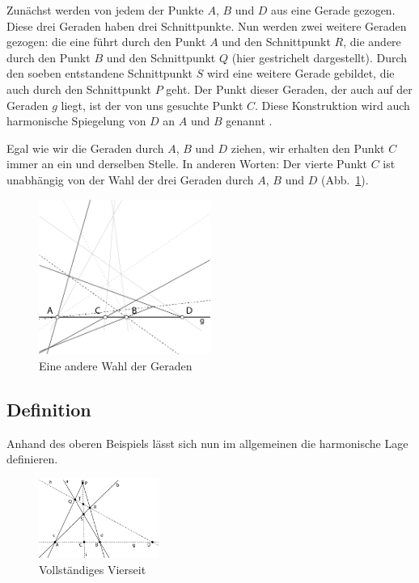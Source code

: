 \documentclass[12pt,a4paper]{article}
\begin{document}
Zunächst werden von jedem der Punkte $A$, $B$ und $D$ aus eine Gerade gezogen. Diese drei Geraden haben drei Schnittpunkte. Nun werden zwei weitere Geraden gezogen: die eine führt durch den Punkt $A$ und den Schnittpunkt $R$, die andere durch den Punkt $B$ und den Schnittpunkt $Q$ (hier gestrichelt dargestellt).
\newline
\newline
Durch den soeben entstandene Schnittpunkt $S$ wird eine weitere Gerade gebildet, die auch durch den Schnittpunkt $P$ geht. Der Punkt dieser Geraden, der auch auf der Geraden $g$ liegt, ist der von uns gesuchte Punkt $C$. Diese Konstruktion wird auch harmonische Spiegelung von $D$ an $A$ und $B$ genannt \citep[vgl.~][S.~34]{harmonischeLage}.

Egal wie wir die Geraden durch $A$, $B$ und $D$ ziehen, wir erhalten den Punkt $C$ immer an ein und derselben Stelle. In anderen Worten: Der vierte Punkt $C$ ist unabhängig von der Wahl der drei Geraden durch $A$, $B$ und $D$ (Abb.~\ref{fig:AndereWahl}).

\begin{figure}[htbp]
\centering
\includegraphics[width=0.5\textwidth]{Bilder/fuer_mehrere_geraden.png}
\caption{Eine andere Wahl der Geraden}
\label{fig:AndereWahl}
\end{figure}

\newpage
\subsection{Definition}
Anhand des oberen Beispiels lässt sich nun im allgemeinen die harmonische Lage definieren.

\begin{figure}
\centering
\includegraphics[width=0.35\textwidth]{Bilder/vollstaendigesVierseit.png}
\caption{Vollständiges Vierseit}
\end{figure}
\end{document}
